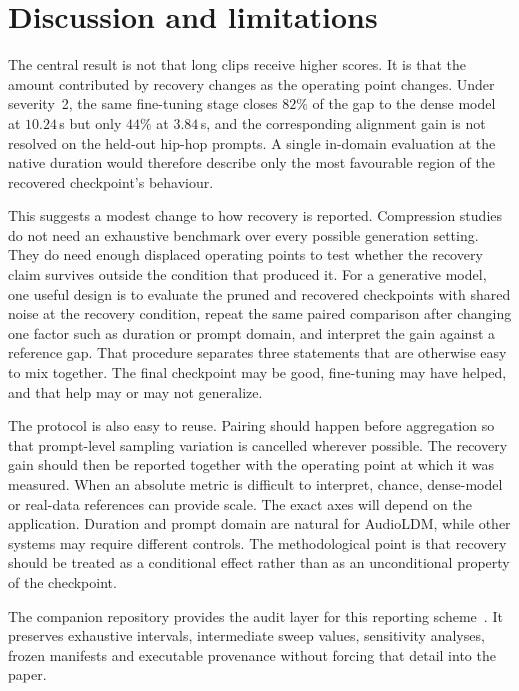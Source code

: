 \section{Discussion and limitations}
The central result is not that long clips receive higher scores. It is that the amount contributed by recovery changes as the operating point changes. Under severity~2, the same fine-tuning stage closes $82\%$ of the gap to the dense model at $10.24$\,s but only $44\%$ at $3.84$\,s, and the corresponding alignment gain is not resolved on the held-out hip-hop prompts. A single in-domain evaluation at the native duration would therefore describe only the most favourable region of the recovered checkpoint's behaviour.

This suggests a modest change to how recovery is reported. Compression studies do not need an exhaustive benchmark over every possible generation setting. They do need enough displaced operating points to test whether the recovery claim survives outside the condition that produced it. For a generative model, one useful design is to evaluate the pruned and recovered checkpoints with shared noise at the recovery condition, repeat the same paired comparison after changing one factor such as duration or prompt domain, and interpret the gain against a reference gap. That procedure separates three statements that are otherwise easy to mix together. The final checkpoint may be good, fine-tuning may have helped, and that help may or may not generalize.

The protocol is also easy to reuse. Pairing should happen before aggregation so that prompt-level sampling variation is cancelled wherever possible. The recovery gain should then be reported together with the operating point at which it was measured. When an absolute metric is difficult to interpret, chance, dense-model or real-data references can provide scale. The exact axes will depend on the application. Duration and prompt domain are natural for AudioLDM, while other systems may require different controls. The methodological point is that recovery should be treated as a conditional effect rather than as an unconditional property of the checkpoint.

The companion repository provides the audit layer for this reporting scheme~\cite{bibbo2026repo}. It preserves exhaustive intervals, intermediate sweep values, sensitivity analyses, frozen manifests and executable provenance without forcing that detail into the paper.

